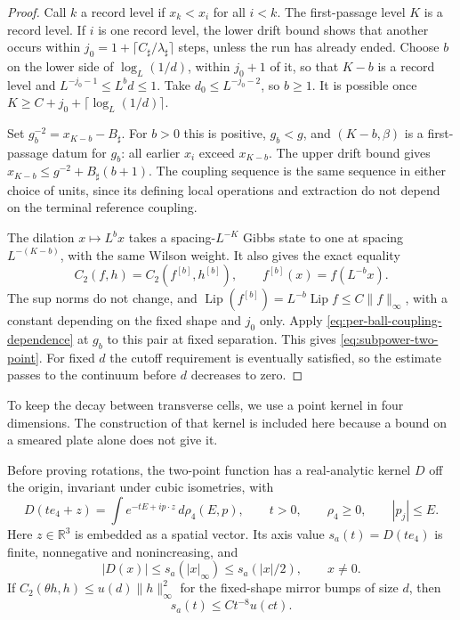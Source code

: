 \documentclass[11pt,letterpaper,reqno]{amsart}
\makeatletter
\theoremstyle{definition}
\newcommand{\ms@minorstart}{%
  \pushQED{\qed}\renewcommand{\qedsymbol}{$\blacksquare$}}
\newenvironment{lemma}[1][]{\ms@minorstart\ms@lemma[#1]}
  {\popQED\endms@lemma}
\theoremstyle{remark}
\newcommand{\R}{\mathbb R}
\newcommand{\Lip}{\operatorname{Lip}}
\makeatother
\begin{document}
\begin{proof}
Call $k$ a record level if $x_k<x_i$ for all $i<k$. The first-passage
level $K$ is a record level. If $i$ is one record level, the lower
drift bound shows that another occurs within
$j_0=1+\lceil C_\sharp/\lambda_\sharp\rceil$ steps, unless the run
has already ended. Choose $b$ on the lower side of $\log_L(1/d)$,
within $j_0+1$ of it, so that $K-b$ is a record level and
$L^{-j_0-1}\le L^bd\le1$. Take $d_0\le L^{-j_0-2}$, so $b\ge1$.
It is possible once
$K\ge C+j_0+\lceil\log_L(1/d)\rceil$.

Set $g_b^{-2}=x_{K-b}-B_\sharp$. For $b>0$ this is positive,
$g_b<g$, and $(K-b,\beta)$ is a first-passage datum for $g_b$:
all earlier $x_i$ exceed $x_{K-b}$. The upper drift bound gives
$x_{K-b}\le g^{-2}+B_\sharp(b+1)$. The coupling sequence is the
same sequence in either choice of units, since its defining local
operations and extraction do not depend on the terminal reference
coupling.

The dilation $x\mapsto L^bx$ takes a spacing-$L^{-K}$ Gibbs state
to one at spacing $L^{-(K-b)}$, with the same Wilson weight. It also
gives the exact equality
\[
 C_2(f,h)=C_2(f^{[b]},h^{[b]}),\qquad
 f^{[b]}(x)=f(L^{-b}x).
\]
The sup norms do not change, and
$\Lip(f^{[b]})=L^{-b}\Lip f\le C\|f\|_\infty$,
with a constant depending on the fixed shape and $j_0$ only.
Apply \eqref{eq:per-ball-coupling-dependence} at $g_b$ to this pair
at fixed separation. This gives \eqref{eq:subpower-two-point}.
For fixed $d$ the cutoff requirement is eventually satisfied, so
the estimate passes to the continuum before $d$ decreases to zero.
\end{proof}

To keep the decay between transverse cells, we use a point kernel in
four dimensions. The construction of that kernel is included here
because a bound on a smeared plate alone does not give it.

\begin{lemma}[The point kernel and its axis bound]
\label{lem:four-dimensional-point-kernel}
Before proving rotations, the two-point function has a real-analytic
kernel $D$ off the origin, invariant under cubic isometries, with
\begin{equation}\label{eq:four-dimensional-spectral-kernel}
 D(te_4+z)=\int e^{-tE+ip\cdot z}\,d\rho_4(E,p),\qquad t>0,
 \qquad \rho_4\ge0,
 \qquad |p_j|\le E.
\end{equation}
Here $z\in\R^3$ is embedded as a spatial vector. Its axis value
$s_a(t)=D(te_4)$ is finite, nonnegative and
nonincreasing, and
\begin{equation}\label{eq:axis-domination}
 |D(x)|\le s_a(|x|_\infty)\le s_a(|x|/2),\qquad x\ne0.
\end{equation}
If $C_2(\theta h,h)\le u(d)\|h\|_\infty^2$ for the fixed-shape
mirror bumps of size $d$, then
\begin{equation}\label{eq:axis-from-mirror-bumps}
 s_a(t)\le Ct^{-8}u(ct).
\end{equation}
\end{lemma}
\end{document}
